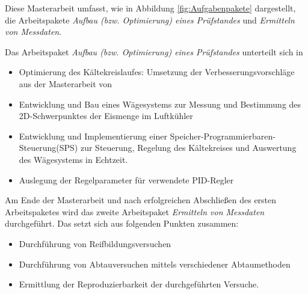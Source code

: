 Diese Masterarbeit umfasst, wie in Abbildung \ref{fig:Aufgabenpakete} dargestellt, die Arbeitspakete \textit{Aufbau (bzw. Optimierung) eines Prüfstandes} und \textit{Ermitteln von Messdaten}.

Das Arbeitspaket \textit{Aufbau (bzw. Optimierung) eines Prüfstandes} unterteilt sich in 

\begin{itemize}

\item Optimierung des Kältekreislaufes: Umsetzung der Verbesserungsvorschläge aus der Masterarbeit von \textsc{\citeauthor{Helmlinger2015}}

\item Entwicklung und Bau eines Wägesystems zur Messung und Bestimmung des 2D-Schwerpunktes der Eismenge im Luftkühler

\item Entwicklung und Implementierung einer Speicher-Programmierbaren-Steuerung(SPS) zur Steuerung, Regelung des Kältekreises und Auswertung des Wägesystems in Echtzeit.

\item Auslegung der Regelparameter für verwendete PID-Regler
\end{itemize}

Am Ende der Masterarbeit und nach erfolgreichen Abschließen des ersten Arbeitspaketes wird das zweite Arbeitspaket \textit{Ermitteln von Messdaten} durchgeführt. Das setzt sich aus folgenden Punkten zusammen:

\begin{itemize}
\item Durchführung von Reifbildungsversuchen
\item Durchführung von Abtauversuchen mittels verschiedener Abtaumethoden
\item Ermittlung der Reproduzierbarkeit der durchgeführten Versuche.
\end{itemize}





